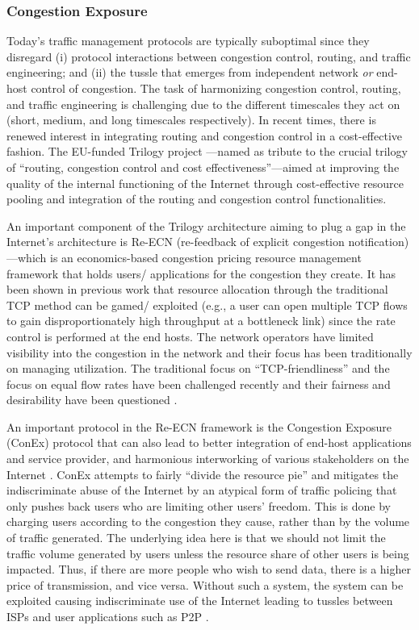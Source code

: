 \documentclass[10pt]{IEEEtran}
\begin{document}
\vspace{2mm}
\subsubsection{Congestion Exposure}

Today's traffic management protocols are typically suboptimal since they disregard (i) protocol interactions between congestion control, routing, and traffic engineering; and (ii) the tussle that emerges from independent network \textit{or} end-host control of congestion. The task of harmonizing congestion control, routing, and traffic engineering is challenging due to the different timescales they act on (short, medium, and long timescales respectively). In recent times, there is renewed interest in integrating routing and congestion control in a cost-effective fashion. The EU-funded Trilogy project \cite{abt2009trilogy}---named as tribute to the crucial trilogy of ``routing, congestion control and cost effectiveness''---aimed at improving the quality of the internal functioning of the Internet through cost-effective resource pooling and integration of the routing and congestion control functionalities.   

An important component of the Trilogy architecture aiming to plug a gap in the Internet's architecture is Re-ECN (re-feedback of explicit congestion notification)---which is an economics-based congestion pricing resource management framework that holds users/ applications for the congestion they create. It has been shown in previous work that resource allocation through the traditional TCP method can be gamed/ exploited (e.g., a user can open multiple TCP flows to gain disproportionately high throughput at a bottleneck link) since the rate control is performed at the end hosts. The network operators have limited visibility into the congestion in the network and their focus has been traditionally on managing utilization. The traditional focus on ``TCP-friendliness'' \cite{floyd1999promoting} and the focus on equal flow rates have been challenged recently and their fairness and desirability have been questioned \cite{briscoe2007flow}. 

An important protocol in the Re-ECN framework is the Congestion Exposure (ConEx) protocol that can also lead to better integration of end-host applications and service provider, and harmonious interworking of various stakeholders on the Internet \cite{briscoe2007flow}. ConEx attempts to fairly ``divide the resource pie'' and mitigates the indiscriminate abuse of the Internet by an atypical form of traffic policing that only pushes back users who are limiting other users' freedom. This is done by charging users according to the congestion they cause, rather than by the volume of traffic generated. The underlying idea here is that we should not limit the traffic volume generated by users unless the resource share of other users is being impacted. Thus, if there are more people who wish to send data, there is a higher price of transmission, and vice versa. Without such a system, the system can be exploited causing indiscriminate use of the Internet leading to tussles between ISPs and user applications such as P2P \cite{briscoe2007flow}. 
\end{document}
